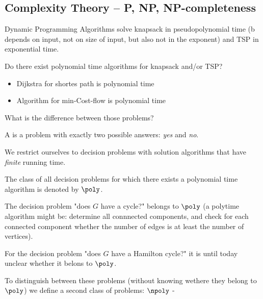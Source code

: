 \begin{lec}[2012-12-15]\end{lec}

\subsection*{Complexity Theory -- P, NP, NP-completeness}

Dynamic Programming Algorithms solve knapsack in pseudopolynomial time
(b depends on input, not on size of input, but also not in the exponent) and
TSP in exponential time.

\begin{qstn}
Do there exist polynomial time algorithms for knapsack and/or TSP?
\end{qstn}

\begin{itemize}
\item Dijkstra for shortes path is polynomial time
\item Algorithm for min-Cost-flow is polynomial time
\end{itemize}

What is the difference between those problems?

\begin{defn}
A  is a problem with exactly two possible answers: \emph{yes} and \emph{no}.
\end{defn}

We restrict ourselves to decision problems with solution algorithms that have \emph{finite} running time.

\begin{defn}
The class of all decision problems for which there exists a polynomial time algorithm is denoted by $\poly$.
\end{defn}

The decision problem "does $G$ have a cycle?" belongs to $\poly$ (a polytime algorithm might be: determine all connnected components, and check for each connected component whether the number of edges is at least the number of vertices).

For the decision problem "does $G$ have a Hamilton cycle?" it is until today unclear whether it belons to $\poly$.

To distinguish between these problems (without knowing wethere they belong to $\poly$) we define a second class of problems: $\npoly$ - 

